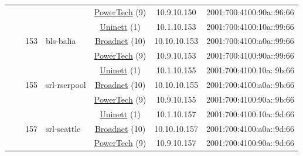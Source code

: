 \begin{small}
\begin{center}
\begin{longtable}{|c|c|c|c|c|c|c|c|}
  &  &  &  & \multicolumn{2}{|c|}{\tiny{\href{http://www.powertech.no}{PowerTech} (9)}} & \tiny{10.9.10.150} & \tiny{2001:700:4100:90a::96:66} \\* \cline{3-3}\cline{4-4}\cline{5-5}\cline{6-6}\cline{7-7}\cline{8-8}
  &  & \multirow{3}{*}{\tiny{153}} & \multicolumn{1}{|l|}{\multirow{3}{*}{\tiny{bls-balia}}} & \multicolumn{2}{|c|}{\tiny{\href{https://www.uninett.no}{Uninett} (1)}} & \tiny{10.1.10.153} & \tiny{2001:700:4100:10a::99:66} \\* \cline{5-5}\cline{6-6}\cline{7-7}\cline{8-8}
  &  &  &  & \multicolumn{2}{|c|}{\tiny{\href{https://www.broadnet.no}{Broadnet} (10)}} & \tiny{10.10.10.153} & \tiny{2001:700:4100:a0a::99:66} \\* \cline{5-5}\cline{6-6}\cline{7-7}\cline{8-8}
  &  &  &  & \multicolumn{2}{|c|}{\tiny{\href{http://www.powertech.no}{PowerTech} (9)}} & \tiny{10.9.10.153} & \tiny{2001:700:4100:90a::99:66} \\* \cline{3-3}\cline{4-4}\cline{5-5}\cline{6-6}\cline{7-7}\cline{8-8}
  &  & \multirow{3}{*}{\tiny{155}} & \multicolumn{1}{|l|}{\multirow{3}{*}{\tiny{srl-rserpool}}} & \multicolumn{2}{|c|}{\tiny{\href{https://www.uninett.no}{Uninett} (1)}} & \tiny{10.1.10.155} & \tiny{2001:700:4100:10a::9b:66} \\* \cline{5-5}\cline{6-6}\cline{7-7}\cline{8-8}
  &  &  &  & \multicolumn{2}{|c|}{\tiny{\href{https://www.broadnet.no}{Broadnet} (10)}} & \tiny{10.10.10.155} & \tiny{2001:700:4100:a0a::9b:66} \\* \cline{5-5}\cline{6-6}\cline{7-7}\cline{8-8}
  &  &  &  & \multicolumn{2}{|c|}{\tiny{\href{http://www.powertech.no}{PowerTech} (9)}} & \tiny{10.9.10.155} & \tiny{2001:700:4100:90a::9b:66} \\* \cline{3-3}\cline{4-4}\cline{5-5}\cline{6-6}\cline{7-7}\cline{8-8}
  &  & \multirow{3}{*}{\tiny{157}} & \multicolumn{1}{|l|}{\multirow{3}{*}{\tiny{srl-seattle}}} & \multicolumn{2}{|c|}{\tiny{\href{https://www.uninett.no}{Uninett} (1)}} & \tiny{10.1.10.157} & \tiny{2001:700:4100:10a::9d:66} \\* \cline{5-5}\cline{6-6}\cline{7-7}\cline{8-8}
  &  &  &  & \multicolumn{2}{|c|}{\tiny{\href{https://www.broadnet.no}{Broadnet} (10)}} & \tiny{10.10.10.157} & \tiny{2001:700:4100:a0a::9d:66} \\* \cline{5-5}\cline{6-6}\cline{7-7}\cline{8-8}
  &  &  &  & \multicolumn{2}{|c|}{\tiny{\href{http://www.powertech.no}{PowerTech} (9)}} & \tiny{10.9.10.157} & \tiny{2001:700:4100:90a::9d:66} \\* \cline{3-3}\cline{4-4}\cline{5-5}\cline{6-6}\cline{7-7}\cline{8-8}

\end{longtable}
\end{center}
\end{small}
